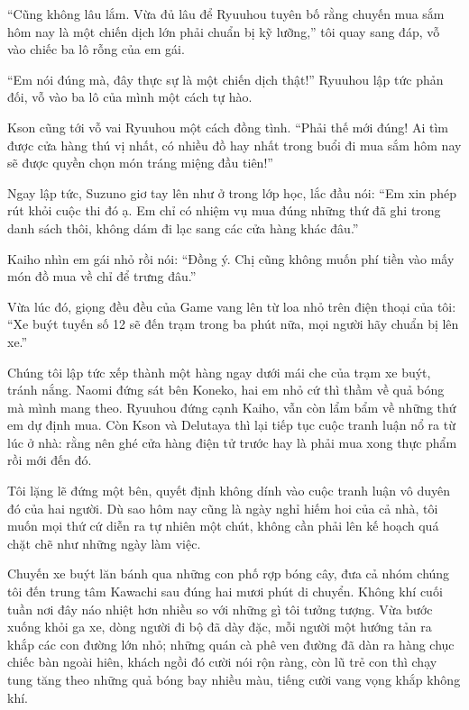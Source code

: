 ﻿\documentclass[../main.tex]{subfiles}
\begin{document}
``Cũng không lâu lắm. Vừa đủ lâu để Ryuuhou tuyên bố rằng chuyến mua sắm hôm nay là một chiến dịch lớn phải chuẩn bị kỹ lưỡng,'' tôi quay sang đáp, vỗ vào chiếc ba lô rỗng của em gái.

``Em nói đúng mà, đây thực sự là một chiến dịch thật!'' Ryuuhou lập tức phản đối, vỗ vào ba lô của mình một cách tự hào.

Kson cũng tới vỗ vai Ryuuhou một cách đồng tình. ``Phải thế mới đúng! Ai tìm được cửa hàng thú vị nhất, có nhiều đồ hay nhất trong buổi đi mua sắm hôm nay sẽ được quyền chọn món tráng miệng đầu tiên!''

Ngay lập tức, Suzuno giơ tay lên như ở trong lớp học, lắc đầu nói: ``Em xin phép rút khỏi cuộc thi đó ạ. Em chỉ có nhiệm vụ mua đúng những thứ đã ghi trong danh sách thôi, không dám đi lạc sang các cửa hàng khác đâu.''

Kaiho nhìn em gái nhỏ rồi nói: ``Đồng ý. Chị cũng không muốn phí tiền vào mấy món đồ mua về chỉ để trưng đâu.''

Vừa lúc đó, giọng đều đều của Game vang lên từ loa nhỏ trên điện thoại của tôi: ``Xe buýt tuyến số 12 sẽ đến trạm trong ba phút nữa, mọi người hãy chuẩn bị lên xe.''

Chúng tôi lập tức xếp thành một hàng ngay dưới mái che của trạm xe buýt, tránh nắng. Naomi đứng sát bên Koneko, hai em nhỏ cứ thì thầm về quả bóng mà mình mang theo. Ryuuhou đứng cạnh Kaiho, vẫn còn lẩm bẩm về những thứ em dự định mua. Còn Kson và Delutaya thì lại tiếp tục cuộc tranh luận nổ ra từ lúc ở nhà: rằng nên ghé cửa hàng điện tử trước hay là phải mua xong thực phẩm rồi mới đến đó.

Tôi lặng lẽ đứng một bên, quyết định không dính vào cuộc tranh luận vô duyên đó của hai người. Dù sao hôm nay cũng là ngày nghỉ hiếm hoi của cả nhà, tôi muốn mọi thứ cứ diễn ra tự nhiên một chút, không cần phải lên kế hoạch quá chặt chẽ như những ngày làm việc.

\ct

Chuyến xe buýt lăn bánh qua những con phố rợp bóng cây, đưa cả nhóm chúng tôi đến trung tâm Kawachi sau đúng hai mươi phút di chuyển. Không khí cuối tuần nơi đây náo nhiệt hơn nhiều so với những gì tôi tưởng tượng. Vừa bước xuống khỏi ga xe, dòng người đi bộ đã dày đặc, mỗi người một hướng tản ra khắp các con đường lớn nhỏ; những quán cà phê ven đường đã dàn ra hàng chục chiếc bàn ngoài hiên, khách ngồi đó cười nói rộn ràng, còn lũ trẻ con thì chạy tung tăng theo những quả bóng bay nhiều màu, tiếng cười vang vọng khắp không khí.
\end{document}
